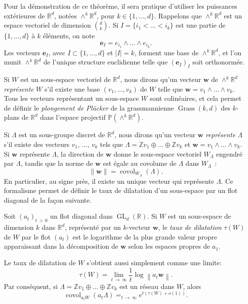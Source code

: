 \documentclass[AHL,Unicode,longabstracts,francais,published]{cedram}
\DeclareMathOperator{\Grass}{Grass}
\DeclareMathOperator{\covol}{covol}
\DeclareMathOperator{\GL}{GL}
\newcommand{\se}[2]{\{#1,\dots,#2\}}
\newcommand{\R}{\mathbb{R}}
\newcommand{\Z}{\mathbb{Z}}
\newcommand{\PP}{\mathbb{P}}
\newcommand{\bw}{\mathbf{w}}
\newcommand{\be}{\mathbf{e}}
\begin{document}
Pour la démonstration de ce théorème, il sera pratique d'utiliser les puissances extérieures de $\R^d$, notées $\wedge^k\R^d$, pour $k\in\se{1}{d}$. Rappelons que $\wedge^k\R^d$ est un espace vectoriel de dimension $\binom{d}{k}$. Si $I=\{i_1<\dots<i_k\}$ est une partie de $\se{1}{d}$ à $k$ éléments, on note
\[
\be_I=e_{i_1}\wedge\dots\wedge e_{i_k}.
\]
Les vecteurs $\be_I$, avec $I\subset\se{1}{d}$ et $|I|=k$, forment une base de $\wedge^k\R^d$, et l'on munit $\wedge^k\R^d$ de l'unique structure euclidienne telle que $(\be_I)_I$ soit orthonormée.

Si $W$ est un sous-espace vectoriel de $\R^d$, nous dirons qu'un vecteur $\bw$ de $\wedge^k\R^d$ \emph{représente} $W$ s'il existe une base $(v_1,\dots,v_k)$ de $W$ telle que $\bw=v_1\wedge\dots\wedge v_k$. Tous les vecteurs représentant un sous-espace $W$ sont colinéaires, et cela permet de définir le \emph{plongement de Pl\"ucker} de la grassmannienne $\Grass(k,d)$ des $k$-plans de $\R^d$ dans l'espace projectif $\PP(\wedge^k\R^d)$.

Si $\Lambda$ est un sous-groupe discret de $\R^d$, nous dirons qu'un vecteur $\bw$ \emph{représente} $\Lambda$ s'il existe des vecteurs $v_1,\,\dots,\,v_k$ tels que $\Lambda=\Z v_1\oplus\dots\oplus\Z v_k$ et $\bw=v_1\wedge\dots\wedge v_k$. Si $\bw$ représente $\Lambda$, la direction de $\bw$ donne le sous-espace vectoriel $W_\Lambda$ engendré par $\Lambda$, tandis que la norme de $\bw$ est égale au covolume de $\Lambda$ dans $W_\Lambda$~:
\[
\|\bw\| = \covol_{W_\Lambda}(\Lambda).
\]
En particulier, au signe près, il existe un unique vecteur qui représente $\Lambda$. Ce formalisme permet de définir le taux de dilatation d'un sous-espace par un flot diagonal de la façon suivante.

\begin{defi}
Soit $(a_t)_{t\,>\,0}$ un flot diagonal dans $\GL_d(\R)$. Si $W$ est un sous-espace de dimension $k$ dans $\R^d$, représenté par un $k$-vecteur $\bw$, le \emph{taux de dilatation} $\tau(W)$ de $W$ par le flot $(a_t)$ est le logarithme de la plus grande valeur propre apparaissant dans la décomposition de $\bw$ selon les espaces propres de $a_1$.
\end{defi}

\begin{rema}
Le taux de dilatation de $W$ s'obtient aussi simplement comme une limite:
\[
\tau(W) = \lim_{t\,\to\,\infty}\frac{1}{t}\log\left\|a_t\bw\right\|.
\]
Par conséquent, si $\Lambda=\Z v_1\oplus\dots\oplus\Z v_k$ est un réseau dans $W$, alors
\[
\covol_{a_tW}\left(a_t\Lambda\right) =_{t\,\to\,\infty} e^{t\left(\tau(W)+o(1)\right)}.
\]
\end{rema}
\end{document}
